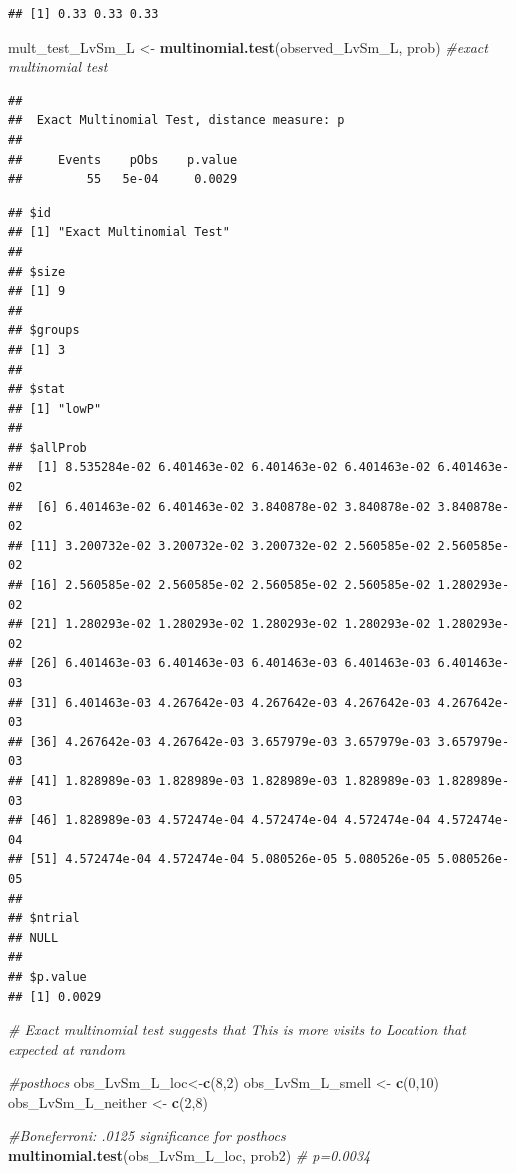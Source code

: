 \documentclass[]{article}
\newenvironment{Shaded}{\begin{snugshade}}{\end{snugshade}}
\newcommand{\KeywordTok}[1]{\textcolor[rgb]{0.13,0.29,0.53}{\textbf{{#1}}}}
\newcommand{\DecValTok}[1]{\textcolor[rgb]{0.00,0.00,0.81}{{#1}}}
\newcommand{\StringTok}[1]{\textcolor[rgb]{0.31,0.60,0.02}{{#1}}}
\newcommand{\CommentTok}[1]{\textcolor[rgb]{0.56,0.35,0.01}{\textit{{#1}}}}
\newcommand{\NormalTok}[1]{{#1}}
\begin{document}
\begin{verbatim}
## [1] 0.33 0.33 0.33
\end{verbatim}

\begin{Shaded}
\begin{Highlighting}[]
\NormalTok{mult_test_LvSm_L <-}\StringTok{ }\KeywordTok{multinomial.test}\NormalTok{(observed_LvSm_L, prob) }\CommentTok{#exact multinomial test}
\end{Highlighting}
\end{Shaded}

\begin{verbatim}
## 
##  Exact Multinomial Test, distance measure: p
## 
##     Events    pObs    p.value
##         55   5e-04     0.0029
\end{verbatim}

\begin{Shaded}
\end{Shaded}

\begin{verbatim}
## $id
## [1] "Exact Multinomial Test"
## 
## $size
## [1] 9
## 
## $groups
## [1] 3
## 
## $stat
## [1] "lowP"
## 
## $allProb
##  [1] 8.535284e-02 6.401463e-02 6.401463e-02 6.401463e-02 6.401463e-02
##  [6] 6.401463e-02 6.401463e-02 3.840878e-02 3.840878e-02 3.840878e-02
## [11] 3.200732e-02 3.200732e-02 3.200732e-02 2.560585e-02 2.560585e-02
## [16] 2.560585e-02 2.560585e-02 2.560585e-02 2.560585e-02 1.280293e-02
## [21] 1.280293e-02 1.280293e-02 1.280293e-02 1.280293e-02 1.280293e-02
## [26] 6.401463e-03 6.401463e-03 6.401463e-03 6.401463e-03 6.401463e-03
## [31] 6.401463e-03 4.267642e-03 4.267642e-03 4.267642e-03 4.267642e-03
## [36] 4.267642e-03 4.267642e-03 3.657979e-03 3.657979e-03 3.657979e-03
## [41] 1.828989e-03 1.828989e-03 1.828989e-03 1.828989e-03 1.828989e-03
## [46] 1.828989e-03 4.572474e-04 4.572474e-04 4.572474e-04 4.572474e-04
## [51] 4.572474e-04 4.572474e-04 5.080526e-05 5.080526e-05 5.080526e-05
## 
## $ntrial
## NULL
## 
## $p.value
## [1] 0.0029
\end{verbatim}

\begin{Shaded}
\begin{Highlighting}[]
\CommentTok{# Exact multinomial test suggests that This is more visits to Location that expected at random}

\CommentTok{#posthocs}
\NormalTok{obs_LvSm_L_loc<-}\KeywordTok{c}\NormalTok{(}\DecValTok{8}\NormalTok{,}\DecValTok{2}\NormalTok{)}
\NormalTok{obs_LvSm_L_smell <-}\StringTok{ }\KeywordTok{c}\NormalTok{(}\DecValTok{0}\NormalTok{,}\DecValTok{10}\NormalTok{)}
\NormalTok{obs_LvSm_L_neither <-}\StringTok{ }\KeywordTok{c}\NormalTok{(}\DecValTok{2}\NormalTok{,}\DecValTok{8}\NormalTok{)}

\CommentTok{#Boneferroni: .0125 significance for posthocs}
 \KeywordTok{multinomial.test}\NormalTok{(obs_LvSm_L_loc, prob2) }\CommentTok{# p=0.0034}
\end{Highlighting}
\end{Shaded}
\end{document}
